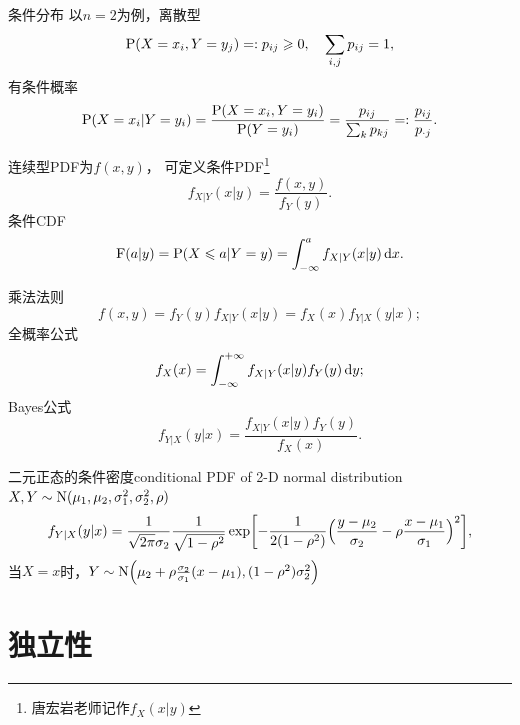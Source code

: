 \begin{definition}
	{条件分布}{}
	以$n=2$为例，离散型
	\[
		\P(X=x_i,Y=y_j)=:p_{ij}\geqslant 0,\quad\sum_{i,j}p_{ij}=1,
	\]
	有条件概率
	\begin{equation}
		\P(X=x_i|Y=y_i)=\frac{\P(X=x_i,Y=y_i)}{\P(Y=y_i)}=\frac{p_{ij}}{\sum_kp_{kj}}=:\frac{p_{ij}}{p_{\cdot j}}.
	\end{equation}
	
	连续型PDF为$f(x,y)$，
	可定义条件PDF\footnote{唐宏岩老师记作$f_X(x|y)$}
	\begin{equation}
		f_{X|Y}(x|y)=\frac{f(x,y)}{f_Y(y)}.
	\end{equation}
	条件CDF
	\[
		\CDF(a|y)=\P(X\leqslant a|Y=y)=\int_{-\infty}^af_{X|Y}(x|y)\d x.
	\]%
\end{definition}

\begin{corollary}
	乘法法则
	\begin{equation}
		f(x,y)=f_Y(y)f_{X|Y}(x|y)=f_X(x)f_{Y|X}(y|x);
	\end{equation}
	全概率公式 
	\begin{equation}
		f_X(x)=\int\iti f_{X|Y}(x|y)f_Y(y)\d y;
	\end{equation}
	Bayes公式 
	\begin{equation}
		f_{Y|X}(y|x)=\frac{f_{X|Y}(x|y)f_Y(y)}{f_X(x)}.
	\end{equation}
\end{corollary}

\begin{example}{二元正态的条件密度}{conditional PDF of 2-D normal distribution}
	$X,Y\sim\Norm(\mu_1,\mu_2,\sigma_1^2,\sigma_2^2,\rho)$
	\begin{equation}
		f_{Y|X}(y|x)=\frac1{\sqrt{2\pi}\sigma_2}\frac1{\sqrt{1-\rho^2}}\exp\biggfkh{-\frac1{2(1-\rho^2)}\Bigkh{\frac{y-\mu_2}{\sigma_2}-\rho\frac{x-\mu_1}{\sigma_1}}^2},
	\end{equation}
	当$X=x$时，$Y\sim\Norm\Bigkh{\mu_2+\rho\frac{\sigma_2}{\sigma_1}(x-\mu_1),(1-\rho^2)\sigma_2^2}$
\end{example}

\section{独立性}

